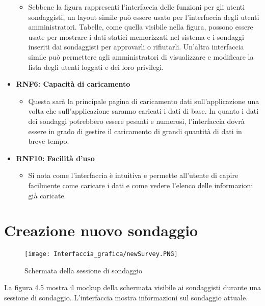 \begin{itemize}
\begin{itemize}
            \item Sebbene la figura rappresenti l'interfaccia delle funzioni per gli utenti sondaggisti, un layout simile può essere usato per l'interfaccia degli utenti amministratori. Tabelle, come quella visibile nella figura, possono essere usate per mostrare i dati statici memorizzati nel sistema e i sondaggi inseriti dai sondaggisti per approvarli o rifiutarli. Un'altra interfaccia simile può permettere agli amministratori di visualizzare e modificare la lista degli utenti loggati e dei loro privilegi.
        \end{itemize} 
        \item \textbf{RNF6: Capacità di caricamento} \begin{itemize}
            \item Questa sarà la principale pagina di caricamento dati sull'applicazione una volta che sull'applicazione saranno caricati i dati di base. In quanto i dati dei sondaggi potrebbero essere pesanti e numerosi, l'interfaccia dovrà essere in grado di gestire il caricamento di grandi quantità di dati in breve tempo.
        \end{itemize}
        \item \textbf{RNF10: Facilità d'uso} \begin{itemize}
            \item Si nota come l'interfaccia è intuitiva e permette all'utente di capire facilmente come caricare i dati e come vedere l'elenco delle informazioni già caricate.
        \end{itemize}
    \end{itemize}

\section{Creazione nuovo sondaggio}

    \begin{figure}[H]
        \center
        \texttt{[image: Interfaccia\_grafica/newSurvey.PNG]}
        \caption{Schermata della sessione di sondaggio}
    \end{figure}

    La figura 4.5 mostra il mockup della schermata visibile ai sondaggisti durante una sessione di sondaggio. L'interfaccia mostra informazioni sul sondaggio attuale.

